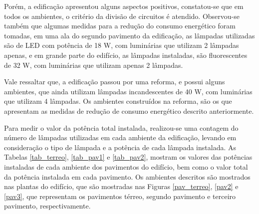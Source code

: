 Porém, a edificação apresentou alguns aspectos positivos, constatou-se que em todos os ambientes, o critério da divisão de circuitos é atendido. Observou-se também que algumas medidas para a redução do consumo energético foram tomadas, em uma ala do segundo pavimento da edificação, as lâmpadas utilizadas são de LED com potência de 18 W, com luminárias que utilizam 2 lâmpadas apenas, e em grande parte do edifício, as lâmpadas instaladas, são fluorescentes de 32 W, com luminárias que utilizam apenas 2 lâmpadas.

Vale ressaltar que, a edificação passou por uma reforma, e possui alguns ambientes, que ainda utilizam lâmpadas incandescentes de 40 W, com luminárias que utilizam 4 lâmpadas. Os ambientes construídos na reforma, são os que apresentam as medidas de redução de consumo energético descrito anteriormente.

Para medir o valor da potência total instalada, realizou-se uma contagem do número de lâmpadas utilizadas em cada ambiente da edificação, levando em consideração o tipo de lâmpada e a potência de cada lâmpada instalada. As Tabelas \ref{tab_terreo}, \ref{tab_pav1} e \ref{tab_pav2}, mostram os valores das potências instaladas de cada ambiente dos pavimentos do edifício, bem como o valor total da potência instalada em cada pavimento. Os ambientes descritos são mostrados nas plantas do edifício, que são mostradas nas Figuras \ref{pav_terreo}, \ref{pav2} e \ref{pav3}, que representam os pavimentos térreo, segundo pavimento e terceiro pavimento, respectivamente. 



